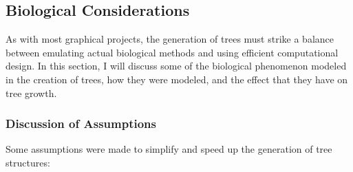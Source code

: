 \documentclass{article}
\newcommand{\tab}{\hspace*{2em}}
\begin{document}
        \subsection{Biological Considerations}
    \tab As with most graphical projects, the generation of trees must strike a balance between
emulating actual biological methods and using efficient computational design. In this section, I
will discuss some of the biological phenomenon modeled in the creation of trees, how they were
modeled, and the effect that they have on tree growth. 

            \subsubsection{Discussion of Assumptions}
            \label{subsubsec:assumptions}
    \tab Some assumptions were made to simplify and speed up the generation of tree structures:
\end{document}

